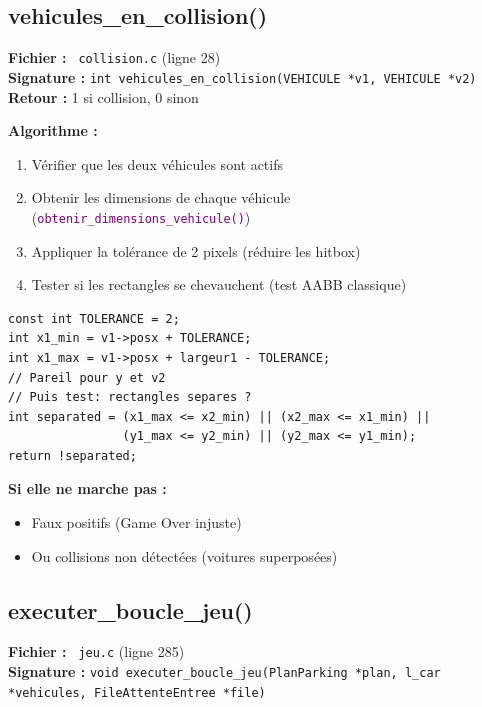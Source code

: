 \documentclass[11pt,a4paper]{article}
\newcommand{\code}[1]{\texttt{\textcolor{accent}{#1}}}
\newcommand{\fichier}[1]{\texttt{\textcolor{primary}{\faIcon{file-code} #1}}}
\newcommand{\fonction}[1]{\texttt{\textcolor{purple}{#1()}}}
\begin{document}
\subsection{vehicules\_en\_collision()}

\begin{funcbox}
\textbf{Fichier :} \fichier{collision.c} (ligne 28)\\
\textbf{Signature :} \code{int vehicules\_en\_collision(VEHICULE *v1, VEHICULE *v2)}\\
\textbf{Retour :} 1 si collision, 0 sinon
\end{funcbox}

\textbf{Algorithme :}
\begin{enumerate}[noitemsep]
    \item Vérifier que les deux véhicules sont actifs
    \item Obtenir les dimensions de chaque véhicule (\fonction{obtenir\_dimensions\_vehicule})
    \item Appliquer la tolérance de 2 pixels (réduire les hitbox)
    \item Tester si les rectangles se chevauchent (test AABB classique)
\end{enumerate}

\begin{codebox}
\begin{lstlisting}
const int TOLERANCE = 2;
int x1_min = v1->posx + TOLERANCE;
int x1_max = v1->posx + largeur1 - TOLERANCE;
// Pareil pour y et v2
// Puis test: rectangles separes ?
int separated = (x1_max <= x2_min) || (x2_max <= x1_min) ||
                (y1_max <= y2_min) || (y2_max <= y1_min);
return !separated;
\end{lstlisting}
\end{codebox}

\textbf{Si elle ne marche pas :}
\begin{itemize}[noitemsep]
    \item Faux positifs (Game Over injuste)
    \item Ou collisions non détectées (voitures superposées)
\end{itemize}

\subsection{executer\_boucle\_jeu()}

\begin{funcbox}
\textbf{Fichier :} \fichier{jeu.c} (ligne 285)\\
\textbf{Signature :} \code{void executer\_boucle\_jeu(PlanParking *plan, l\_car *vehicules, FileAttenteEntree *file)}
\end{funcbox}
\end{document}
